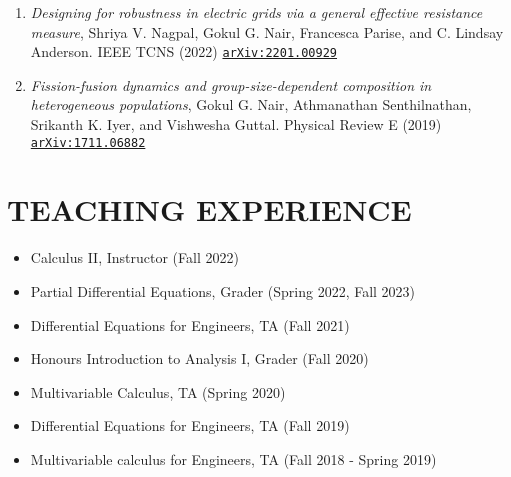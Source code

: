 \documentclass[margin]{res} %
\begin{document}
\begin{resume}
\begin{enumerate}
	\item {\sl Designing for robustness in electric grids via a general effective resistance measure}, Shriya V. Nagpal, Gokul G. Nair, Francesca Parise, and C. Lindsay Anderson. IEEE TCNS (2022) \href{https://arxiv.org/abs/2201.00929}{\texttt{arXiv:2201.00929}}
	
	\item {\sl Fission-fusion dynamics and group-size-dependent composition in heterogeneous populations}, Gokul G. Nair, Athmanathan Senthilnathan, Srikanth K. Iyer, and Vishwesha Guttal. Physical Review E (2019) \href{https://arxiv.org/abs/1711.06882}{\texttt{arXiv:1711.06882}}
\end{enumerate}

\section{TEACHING EXPERIENCE}

\begin{itemize}
	\item Calculus II, Instructor (Fall 2022)
	\item Partial Differential Equations, Grader (Spring 2022, Fall 2023)
	\item Differential Equations for Engineers, TA (Fall 2021)
	\item Honours Introduction to Analysis I, Grader (Fall 2020)
	\item Multivariable Calculus, TA (Spring 2020)
	\item Differential Equations for Engineers, TA (Fall 2019)
	\item Multivariable calculus for Engineers, TA (Fall 2018 - Spring 2019)
\end{itemize}


\end{resume}
\end{document}
